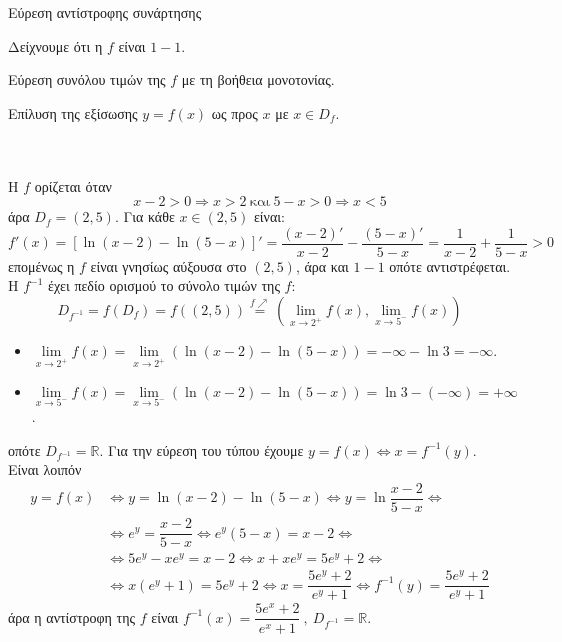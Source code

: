 \begin{askhsh}{Εύρεση αντίστροφης συνάρτησης}
\bhmata\begin{bhma}
\item Δείχνουμε ότι η $f$ είναι $1-1$.
\item Εύρεση συνόλου τιμών της $ f $ με τη βοήθεια μονοτονίας.
\item Επίλυση της εξίσωσης $ y=f(x) $ ως προς $ x $ με $ x\in D_f $.
\end{bhma}
\end{askhsh}
\\\\
\lysh
Η $f$ ορίζεται όταν
\[
x-2>0\Rightarrow x>2\ \text{και}\ 5-x>0\Rightarrow x<5
\]
άρα $D_f=(2,5)$. Για κάθε $x\in(2,5)$ είναι:
\[ f'(x)=\left[\ln{(x-2)-\ln{(5-x)}}\right]'=\dfrac{(x-2)'}{x-2}-\dfrac{(5-x)'}{5-x}=\dfrac{1}{x-2}+\dfrac{1}{5-x}>0 \]
επομένως η $f$ είναι γνησίως αύξουσα στο $(2,5)$, άρα και $1-1$ οπότε αντιστρέφεται. Η $f^{-1}$ έχει πεδίο ορισμού το σύνολο τιμών της $f$:
\[ D_{f^{-1}}=f(D_f)=f((2,5))\stackrel{f\nearrow}{=}\left(\lim\limits_{x\to2^+}{f(x)},\lim\limits_{x\to5^-}{f(x)}\right) \]
\begin{itemize}
\item $\lim\limits_{x\to2^+}{f(x)}=\lim\limits_{x\to2^+}{\left(\ln{(x-2)}-\ln{(5-x)}\right)}=-\infty-\ln{3}=-\infty$.
\item $\lim\limits_{x\to5^-}{f(x)}=\lim\limits_{x\to5^-}{\left(\ln{(x-2)}-\ln{(5-x)}\right)}=\ln{3}-(-\infty)=+\infty$.
\end{itemize}
οπότε $D_{f^{-1}}=\mathbb{R}$. Για την εύρεση του τύπου έχουμε $y=f(x)\Leftrightarrow x=f^{-1}(y)$. Είναι λοιπόν
\begin{align*}
y=f(x)&\Leftrightarrow y=\ln{(x-2)}-\ln{(5-x)}\Leftrightarrow y=\ln{\dfrac{x-2}{5-x}}\Leftrightarrow\\
&\Leftrightarrow e^y=\dfrac{x-2}{5-x}\Leftrightarrow e^y(5-x)=x-2\Leftrightarrow\\
&\Leftrightarrow 5e^y-xe^y=x-2\Leftrightarrow x+xe^y=5e^y+2\Leftrightarrow\\
&\Leftrightarrow x\left(e^y+1\right)=5e^y+2\Leftrightarrow x=\dfrac{5e^y+2}{e^y+1}\Leftrightarrow f^{-1}(y)=\dfrac{5e^y+2}{e^y+1}
\end{align*}
άρα η αντίστροφη της $f$ είναι $f^{-1}(x)=\dfrac{5e^x+2}{e^x+1}\ ,\ D_{f^{-1}}=\mathbb{R}$.


